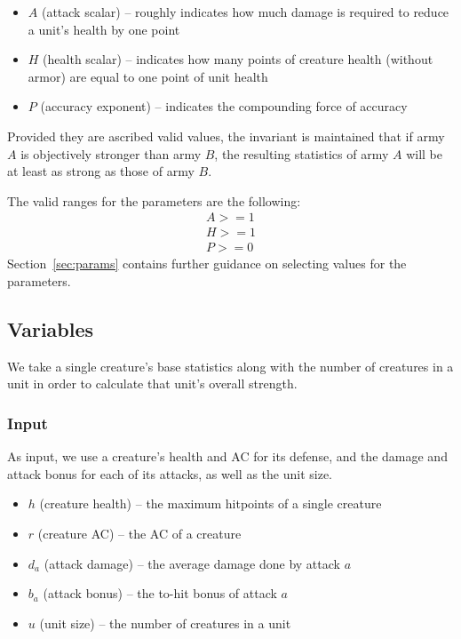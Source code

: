 \documentclass{article}
\begin{document}
\begin{itemize}
    \item $A$ (attack scalar) -- roughly indicates how much damage is required to reduce a unit's health by one point
    \item $H$ (health scalar) -- indicates how many points of creature health (without armor) are equal to one point of unit health
    \item $P$ (accuracy exponent) -- indicates the compounding force of accuracy
\end{itemize}

Provided they are ascribed valid values,
the invariant is maintained that if army $A$ is objectively stronger than army $B$,
the resulting statistics of army $A$ will be at least as strong as those of army $B$.

The valid ranges for the parameters are the following:
\begin{align*}
    A >= 1 \\
    H >= 1 \\
    P >= 0
\end{align*}
Section~\ref{sec:params} contains further guidance on selecting values for the parameters.

\subsection{Variables}

We take a single creature's base statistics along with the number of creatures in a unit
in order to calculate that unit's overall strength.

\subsubsection{Input}

As input, we use a creature's health and AC for its defense,
and the damage and attack bonus for each of its attacks,
as well as the unit size.

\begin{itemize}
    \item $h$ (creature health) -- the maximum hitpoints of a single creature
    \item $r$ (creature AC) -- the AC of a creature
    \item $d_a$ (attack damage) -- the average damage done by attack $a$
    \item $b_a$ (attack bonus) -- the to-hit bonus of attack $a$
    \item $u$ (unit size) -- the number of creatures in a unit
\end{itemize}
\end{document}
